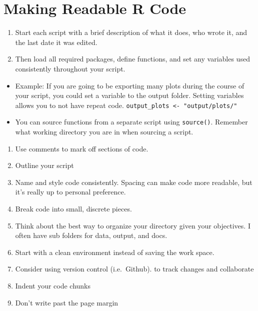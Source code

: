 \documentclass[
]{book}
\providecommand{\tightlist}{%
  \setlength{\itemsep}{0pt}\setlength{\parskip}{0pt}}
\begin{document}
\section{Making Readable R Code}\label{making-readable-r-code}

\begin{enumerate}
\def\labelenumi{\arabic{enumi})}
\tightlist
\item
  Start each script with a brief description of what it does, who wrote it, and the last date it was edited.
\item
  Then load all required packages, define functions, and set any variables used consistently throughout your script.
\end{enumerate}

\begin{itemize}
\tightlist
\item
  Example: If you are going to be exporting many plots during the course of your script, you could set a variable to the output folder. Setting variables allows you to not have repeat code.
  \texttt{output\_plots\ \textless{}-\ "output/plots/"}
\item
  You can source functions from a separate script using \texttt{source()}. Remember what working directory you are in when sourcing a script.
\end{itemize}

\begin{enumerate}
\def\labelenumi{\arabic{enumi})}
\setcounter{enumi}{3}
\tightlist
\item
  Use comments to mark off sections of code.
\item
  Outline your script
\item
  Name and style code consistently. Spacing can make code more readable, but it's really up to personal preference.
\item
  Break code into small, discrete pieces.
\item
  Think about the best way to organize your directory given your objectives. I often have sub folders for data, output, and docs.
\item
  Start with a clean environment instead of saving the work space.
\item
  Consider using version control (i.e.~Github). to track changes and collaborate
\item
  Indent your code chunks
\item
  Don't write past the page margin
\end{enumerate}
\end{document}
